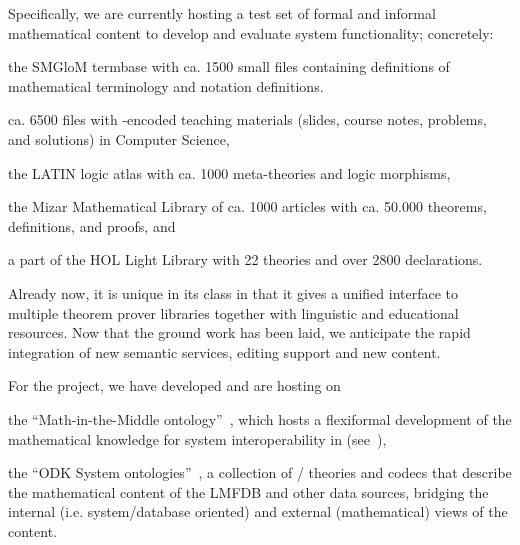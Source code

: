 Specifically, we are currently hosting a test set of formal and informal mathematical
content to develop and evaluate system functionality; concretely:
\begin{compactenum}[\em i\rm)]
\item the SMGloM termbase with ca. 1500 small \sTeX files containing definitions of
  mathematical terminology and notation definitions.
\item ca. 6500 files with \sTeX-encoded teaching materials (slides, course notes,
  problems, and solutions) in Computer Science,
\item the LATIN logic atlas with ca. 1000 meta-theories and logic morphisms,
\item the Mizar Mathematical Library of ca. 1000 articles with ca. 50.000 theorems,
  definitions, and proofs, and
\item a part of the HOL Light Library with 22 theories and over 2800 declarations.
\end{compactenum}
Already now, it is unique in its class in that it gives a unified interface to multiple
theorem prover libraries together with linguistic and educational resources. Now that the
ground work has been laid, we anticipate the rapid integration of new semantic services,
editing support and new content.

For the \pn project, we have developed and are hosting on \sys
\begin{compactenum}
\item the ``Math-in-the-Middle ontology''~\cite{MitM:on}, which hosts a flexiformal
  development of the mathematical knowledge for system interoperability in \pn
  (see~\cite{DehKohKon:iop16,ODK-D6.2}),
\item the ``ODK System ontologies''~\cite{ODKsysonto:on}, a collection of \omdoc/\mmt
  theories and codecs that describe the mathematical content of the LMFDB and other data
  sources, bridging the internal (i.e. system/database oriented) and external
  (mathematical) views of the content.
\end{compactenum}


